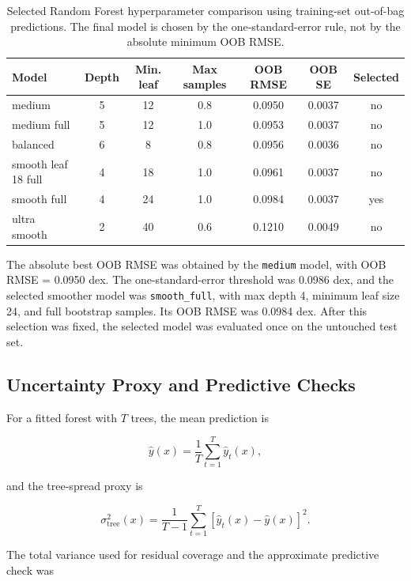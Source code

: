 \documentclass{article}
\numberwithin{equation}{section}
\begin{document}
\begin{table}[H]
\centering
\caption{Selected Random Forest hyperparameter comparison using training-set out-of-bag predictions. The final model is chosen by the one-standard-error rule, not by the absolute minimum OOB RMSE.}
\label{tab:rf-model-comparison}
\begin{tabular}{lcccccc}
\toprule
Model & Depth & Min. leaf & Max samples & OOB RMSE & OOB SE & Selected \\
\midrule
medium & 5 & 12 & 0.8 & 0.0950 & 0.0037 & no \\
medium full & 5 & 12 & 1.0 & 0.0953 & 0.0037 & no \\
balanced & 6 & 8 & 0.8 & 0.0956 & 0.0036 & no \\
smooth leaf 18 full & 4 & 18 & 1.0 & 0.0961 & 0.0037 & no \\
smooth full & 4 & 24 & 1.0 & 0.0984 & 0.0037 & yes \\
ultra smooth & 2 & 40 & 0.6 & 0.1210 & 0.0049 & no \\
\bottomrule
\end{tabular}
\end{table}

The absolute best OOB RMSE was obtained by the \texttt{medium} model, with OOB RMSE = 0.0950 dex. The one-standard-error threshold was 0.0986 dex, and the selected smoother model was \texttt{smooth\_full}, with max depth 4, minimum leaf size 24, and full bootstrap samples. Its OOB RMSE was 0.0984 dex. After this selection was fixed, the selected model was evaluated once on the untouched test set.

\subsection{Uncertainty Proxy and Predictive Checks}

For a fitted forest with $T$ trees, the mean prediction is

\begin{equation}
\hat{y}(x)
=
\frac{1}{T}
\sum_{t=1}^{T}
\hat{y}_t(x),
\end{equation}

and the tree-spread proxy is

\begin{equation}
\sigma_{\mathrm{tree}}^2(x)
=
\frac{1}{T-1}
\sum_{t=1}^{T}
\left[\hat{y}_t(x)-\hat{y}(x)\right]^2.
\end{equation}

The total variance used for residual coverage and the approximate predictive check was
\end{document}
